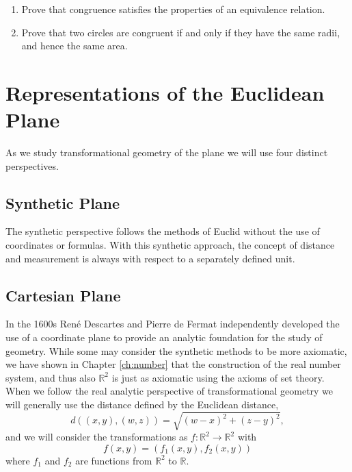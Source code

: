 \documentclass[
]{book}
\theoremstyle{definition}
\theoremstyle{definition}
\theoremstyle{definition}
\theoremstyle{definition}
\theoremstyle{remark}
\begin{document}
\begin{enumerate}
\def\labelenumi{\arabic{enumi}.}
\item
  Prove that congruence satisfies the properties of an equivalence relation.
\item
  Prove that two circles are congruent if and only if they have the same radii, and hence the same area.
\end{enumerate}

\hypertarget{representations-of-the-euclidean-plane}{%
\section{Representations of the Euclidean Plane}\label{representations-of-the-euclidean-plane}}

As we study transformational geometry of the plane we will use four distinct perspectives.

\hypertarget{synthetic-plane}{%
\subsection{Synthetic Plane}\label{synthetic-plane}}

The synthetic perspective follows the methods of Euclid without the use of coordinates or formulas. With this synthetic approach, the concept of distance and measurement is always with respect to a separately defined unit.

\hypertarget{cartesian-plane}{%
\subsection{Cartesian Plane}\label{cartesian-plane}}

In the 1600s René Descartes and Pierre de Fermat independently developed the use of a coordinate plane to provide an analytic foundation for the study of geometry. While some may consider the synthetic methods to be more axiomatic, we have shown in Chapter \ref{ch:number} that the construction of the real number system, and thus also \(\mathbb{R}^2\) is just as axiomatic using the axioms of set theory. When we follow the real analytic perspective of transformational geometry we will generally use the distance defined by the Euclidean distance, \[d\left( (x,y),(w,z)\right) = \sqrt{(w-x)^2+(z-y)^2},\] and we will consider the transformations as
\(f:\mathbb{R}^2 \rightarrow \mathbb{R}^2\) with \[f(x,y)= \left( f_1(x,y), f_2(x,y)\right)\] where \(f_1\) and \(f_2\) are functions from \(\mathbb{R}^2\) to \(\mathbb{R}\).
\end{document}

